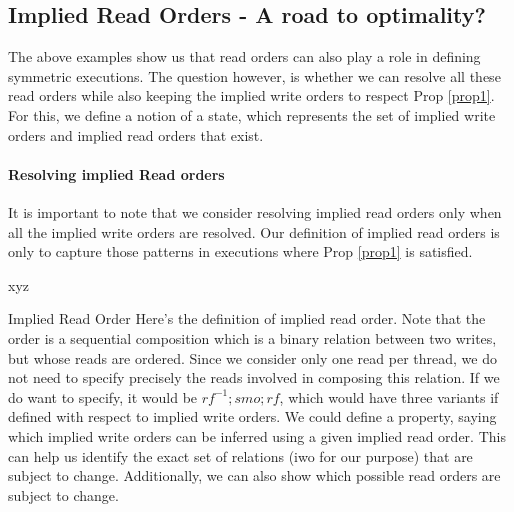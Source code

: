 \subsection{Implied Read Orders - A road to optimality?}


    The above examples show us that read orders can also play a role in defining symmetric executions.
    The question however, is whether we can resolve all these read orders while also keeping the implied write orders to respect Prop \ref{prop1}.
    For this, we define a notion of a state, which represents the set of implied write orders and implied read orders that exist.    

    \paragraph{Resolving implied Read orders}

        It is important to note that we consider resolving implied read orders only when all the implied write orders are resolved.
        Our definition of implied read orders is only to capture those patterns in executions where Prop \ref{prop1} is satisfied.
        
        \begin{definition}
            \label{SymReadOrd}
            xyz
        \end{definition}

        \begin{definition}{Implied Read Order}
            \label{ImpReadOrd}
            Here's the definition of implied read order. 
            Note that the order is a sequential composition which is a binary relation between two writes, but whose reads are ordered.
            Since we consider only one read per thread, we do not need to specify precisely the reads involved in composing this relation.
            If we do want to specify, it would be $rf^{-1};smo;rf$, which would have three variants if defined with respect to implied write orders. 
            We could define a property, saying which implied write orders can be inferred using a given implied read order. 
            This can help us identify the exact set of relations (iwo for our purpose) that are subject to change. 
            Additionally, we can also show which possible read orders are subject to change.
        \end{definition}

